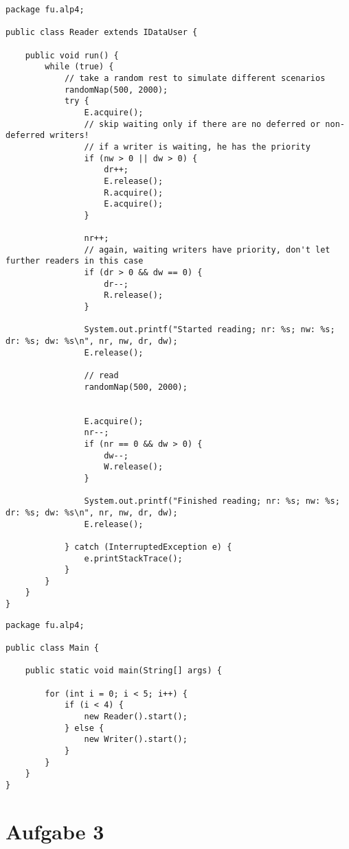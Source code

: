 \begin{lstlisting}[style=java]
package fu.alp4;

public class Reader extends IDataUser {

    public void run() {
        while (true) {
            // take a random rest to simulate different scenarios
            randomNap(500, 2000);
            try {
                E.acquire();
                // skip waiting only if there are no deferred or non-deferred writers!
                // if a writer is waiting, he has the priority
                if (nw > 0 || dw > 0) {
                    dr++;
                    E.release();
                    R.acquire();
                    E.acquire();
                }

                nr++;
                // again, waiting writers have priority, don't let further readers in this case
                if (dr > 0 && dw == 0) {
                    dr--;
                    R.release();
                }

                System.out.printf("Started reading; nr: %s; nw: %s; dr: %s; dw: %s\n", nr, nw, dr, dw);
                E.release();

                // read
                randomNap(500, 2000);


                E.acquire();
                nr--;
                if (nr == 0 && dw > 0) {
                    dw--;
                    W.release();
                }

                System.out.printf("Finished reading; nr: %s; nw: %s; dr: %s; dw: %s\n", nr, nw, dr, dw);
                E.release();

            } catch (InterruptedException e) {
                e.printStackTrace();
            }
        }
    }
}
\end{lstlisting}


\begin{lstlisting}[style=java]
package fu.alp4;

public class Main {

    public static void main(String[] args) {

        for (int i = 0; i < 5; i++) {
            if (i < 4) {
                new Reader().start();
            } else {
                new Writer().start();
            }
        }
    }
}

\end{lstlisting}

\section*{Aufgabe 3}

